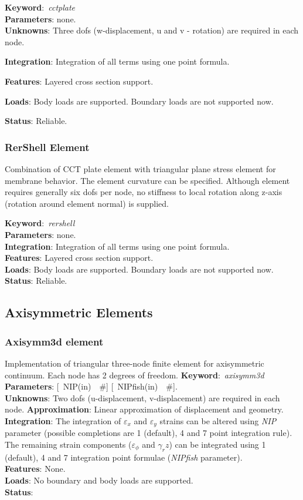 \documentclass[12pt,dvips]{article}
\newcommand{\descitem}[1]{{\noindent \bf #1}:}
\newcommand{\elemkeyword}[1]{\descitem{Keyword}~{\em #1}}
\newcommand{\elemparam}[2]{{{#1\tiny (#2)}~~\#}}
\newcommand{\optelemparam}[2]{{[~\elemparam{#1}{#2}]}}
\newcommand{\param}[1]{{\it #1}}
\begin{document}
\elemkeyword{cctplate}\\
\descitem{Parameters} none.\\
\descitem{Unknowns}
Three dofs (w-displacement, u and v - rotation) are required in each node.


\descitem{Integration}
Integration of all terms using one point formula.

\descitem{Features} Layered cross section support.

\descitem{Loads} Body loads are supported. Boundary loads are
not supported now.

\descitem{Status} Reliable.

\subsubsection {RerShell Element}
Combination of CCT plate element with triangular plane stress element
for membrane behavior. The element curvature can be specified. 
Although element requires generally six dofs per node, no stiffness to
local rotation along z-axis (rotation around element normal) is supplied.

\elemkeyword{rershell}\\
\descitem{Parameters} none.\\
\descitem{Integration}
Integration of all terms using one point formula.\\
\descitem{Features} Layered cross section support.\\
\descitem{Loads} Body loads are supported. Boundary loads are
not supported now.\\
\descitem{Status} Reliable.

\subsection{Axisymmetric Elements}
\subsubsection{Axisymm3d element}
Implementation of triangular three-node finite element 
for axisymmetric continuum. Each node has 2 degrees of freedom.
\elemkeyword{axisymm3d}\\
\descitem{Parameters} \optelemparam{NIP}{in} \optelemparam{NIPfish}{in}.\\
\descitem{Unknowns}
Two dofs (u-displacement, v-displacement) are required in each node.
\descitem{Approximation} Linear approximation of displacement and
geometry.
\descitem{Integration}
The integration of $\varepsilon_x$ and $\varepsilon_y$ strains can be altered using
\param{NIP} parameter (possible completions are 1 (default), 4 and 7
point integration rule). The remaining strain components ($\varepsilon_\phi$ and
$\gamma_rz$) can be integrated using 1 (default), 4 and 7 integration
point formulae (\param{NIPfish} parameter).\\
\descitem{Features} None.\\
\descitem{Loads} No boundary and body loads are supported.\\
\descitem{Status} 
\end{document}
